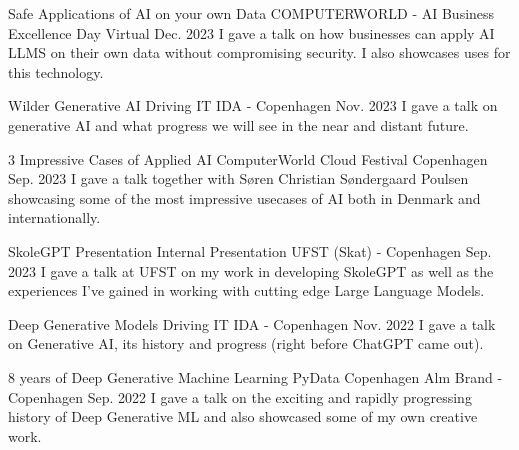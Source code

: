 

\begin{cventries}

    \cventry
    {Safe Applications of AI on your own Data} %
    {COMPUTERWORLD - AI Business Excellence Day} %
    {Virtual} %
    {Dec. 2023} %
    {
      I gave a talk on how businesses can apply AI LLMS on their own data without compromising security. I also showcases uses for this technology.
    }

    \cventry
    {Wilder Generative AI} %
    {Driving IT} %
    {IDA - Copenhagen} %
    {Nov. 2023} %
    {
      I gave a talk on generative AI and what progress we will see in the near and distant future.
    }

    \cventry
    {3 Impressive Cases of Applied AI} %
    {ComputerWorld Cloud Festival} %
    {Copenhagen} %
    {Sep. 2023} %
    {
      I gave a talk together with Søren Christian Søndergaard Poulsen showcasing some of the most impressive usecases of AI both in Denmark and internationally.
    }

    \cventry
    {SkoleGPT Presentation} %
    {Internal Presentation} %
    {UFST (Skat) - Copenhagen} %
    {Sep. 2023} %
    {
      I gave a talk at UFST on my work in developing SkoleGPT as well as the experiences I've gained in working with cutting edge Large Language Models.
    }

    \cventry
    {Deep Generative Models} %
    {Driving IT} %
    {IDA - Copenhagen} %
    {Nov. 2022} %
    {
      I gave a talk on Generative AI, its history and progress (right before ChatGPT came out).
    }

    \cventry
    {8 years of Deep Generative Machine Learning} %
    {PyData Copenhagen} %
    {Alm Brand - Copenhagen} %
    {Sep. 2022} %
    {
      I gave a talk on the exciting and rapidly progressing history of Deep Generative ML and also showcased some of my own creative work.
    }


\end{cventries}